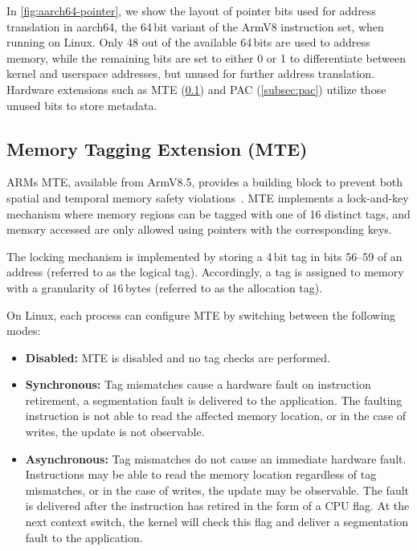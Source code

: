 In \cref{fig:aarch64-pointer}, we show the layout of pointer bits used for address translation in aarch64, the 64\,bit variant of the ArmV8 instruction set\cite{ARMA2024Arch64}, when running on Linux.
Only 48 out of the available 64\,bits are used to address memory, while the remaining bits are set to either 0 or 1 to differentiate between kernel and userspace addresses, but unused for further address translation.
 Hardware extensions such as \ac{MTE} (\cref{subsec:mte}) and \ac{PAC} (\cref{subsec:pac}) utilize those unused bits to store metadata.

\subsection{Memory Tagging Extension (MTE)}
\label{subsec:mte}

ARMs \Ac{MTE}, available from ArmV8.5, provides a building block to prevent both spatial and temporal memory safety violations~\cite{ARM2019MTE}.
MTE implements a lock-and-key mechanism where memory regions can be tagged with one of 16 distinct tags, and memory accessed are only allowed using pointers with the corresponding keys.

The locking mechanism is implemented by storing a 4\,bit tag in bits 56--59 of an address (referred to as the logical tag).
Accordingly, a tag is assigned to memory with a granularity of 16\,bytes (referred to as the allocation tag).

On Linux, each process can configure MTE by switching between the following modes:
\begin{itemize}
    \item \textbf{Disabled:} MTE is disabled and no tag checks are performed.
    \item \textbf{Synchronous:}
    Tag mismatches cause a hardware fault on instruction retirement, a segmentation fault is delivered to the application.
    The faulting instruction is not able to read the affected memory location, or in the case of writes, the update is not observable.
    \item \textbf{Asynchronous:}
    Tag mismatches do not cause an immediate hardware fault.
    Instructions may be able to read the memory location regardless of tag mismatches, or in the case of writes, the update may be observable.
    The fault is delivered after the instruction has retired in the form of a CPU flag.
    At the next context switch, the kernel will check this flag and deliver a segmentation fault to the application.
\end{itemize}

